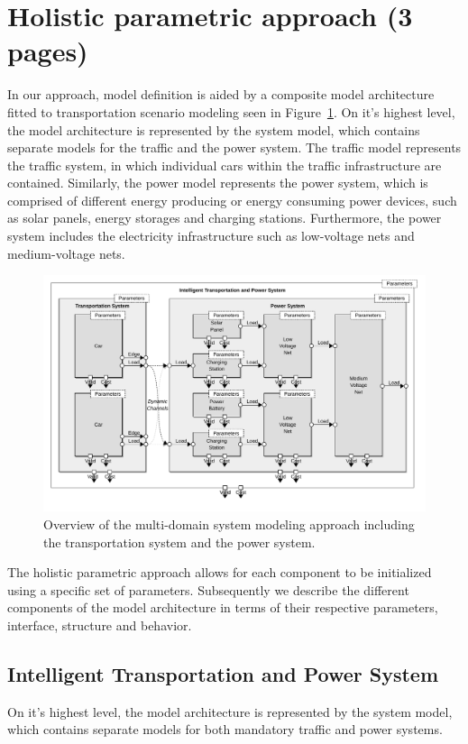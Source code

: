 \section{Holistic parametric approach (3 pages)}
\label{section:contribution_1}

In our approach, model definition is aided by a composite model architecture fitted to transportation scenario modeling seen in Figure~\ref{fig:model}. On it's highest level, the model architecture is represented by the system model, which contains separate models for the traffic and the power system. The traffic model represents the traffic system, in which individual cars within the traffic infrastructure are contained. Similarly, the power model represents the power system, which is comprised of different energy producing or energy consuming power devices, such as solar panels, energy storages and charging stations. Furthermore, the power system includes the electricity infrastructure such as low-voltage nets and medium-voltage nets.

\begin{figure}[h]
	\centering
	\includegraphics[width=\textwidth]{../gfx/model2.pdf}
	\caption{Overview of the multi-domain system modeling approach including the transportation system and the power system.}
	\label{fig:model}
\end{figure}

The holistic parametric approach allows for each component to be initialized using a specific set of parameters. Subsequently we describe the different components of the model architecture in terms of their respective parameters, interface, structure and behavior. 

\subsection{Intelligent Transportation and Power System}
On it's highest level, the model architecture is represented by the system model, which contains separate models for both mandatory traffic and power systems.

